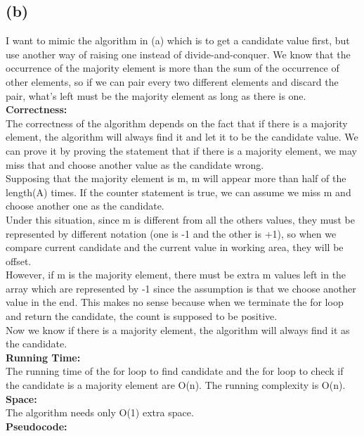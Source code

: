 \documentclass[twoside]{homework}
\begin{document}
\subsection*{(b)}
I want to mimic the algorithm in (a) which is to get a candidate value first, but use another way of raising one instead of divide-and-conquer. We know that the occurrence of the majority element is more than the sum of the occurrence of other elements, so if we can pair every two different elements and discard the pair, what's left must be the majority element as long as there is one.
\\\textbf{Correctness:}\\
The correctness of the algorithm depends on the fact that if there is a majority element, the algorithm will always find it and let it to be the candidate value. We can prove it by proving the statement that if there is a majority element, we may miss that and choose another value as the candidate wrong. 
\\Supposing that the majority element is m, m will appear more than half of the length(A) times. If the counter statement is true, we can assume we miss m and choose another one as the candidate. 
\\Under this situation, since m is different from all the others values, they must be represented by different notation (one is -1 and the other is +1), so when we compare current candidate and the current value in working area, they will be offset. 
\\However, if m is the majority element, there must be extra m values left in the array which are represented by -1 since the assumption is that we choose another value in the end. This makes no sense because when we terminate the for loop and return the candidate, the count is supposed to be positive. 
\\Now we know if there is a majority element, the algorithm will always find it as the candidate.
\\\textbf{Running Time:}\\
The running time of the for loop to find candidate and the for loop to check if the candidate is a majority element are O(n). The running complexity is O(n).
\\\textbf{Space:}\\
The algorithm needs only O(1) extra space.
\\\textbf{Pseudocode:}
\end{document}
